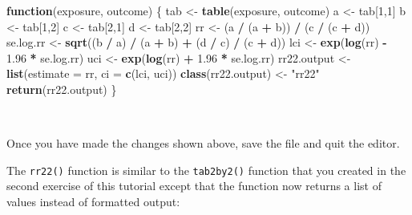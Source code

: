 \documentclass[12pt,a4paper]{book}
\newenvironment{Shaded}{\begin{snugshade}}{\end{snugshade}}
\newcommand{\ControlFlowTok}[1]{\textcolor[rgb]{0.13,0.29,0.53}{\textbf{#1}}}
\newcommand{\DataTypeTok}[1]{\textcolor[rgb]{0.13,0.29,0.53}{#1}}
\newcommand{\DecValTok}[1]{\textcolor[rgb]{0.00,0.00,0.81}{#1}}
\newcommand{\FloatTok}[1]{\textcolor[rgb]{0.00,0.00,0.81}{#1}}
\newcommand{\KeywordTok}[1]{\textcolor[rgb]{0.13,0.29,0.53}{\textbf{#1}}}
\newcommand{\NormalTok}[1]{#1}
\newcommand{\OperatorTok}[1]{\textcolor[rgb]{0.81,0.36,0.00}{\textbf{#1}}}
\newcommand{\StringTok}[1]{\textcolor[rgb]{0.31,0.60,0.02}{#1}}
\theoremstyle{definition}
\theoremstyle{definition}
\theoremstyle{definition}
\theoremstyle{remark}
\begin{document}
\begin{Shaded}
\begin{Highlighting}[]
\ControlFlowTok{function}\NormalTok{(exposure, outcome) \{}
\NormalTok{  tab <-}\StringTok{ }\KeywordTok{table}\NormalTok{(exposure, outcome)}
\NormalTok{  a <-}\StringTok{ }\NormalTok{tab[}\DecValTok{1}\NormalTok{,}\DecValTok{1}\NormalTok{]}
\NormalTok{  b <-}\StringTok{ }\NormalTok{tab[}\DecValTok{1}\NormalTok{,}\DecValTok{2}\NormalTok{]}
\NormalTok{  c <-}\StringTok{ }\NormalTok{tab[}\DecValTok{2}\NormalTok{,}\DecValTok{1}\NormalTok{]}
\NormalTok{  d <-}\StringTok{ }\NormalTok{tab[}\DecValTok{2}\NormalTok{,}\DecValTok{2}\NormalTok{]}
\NormalTok{  rr <-}\StringTok{ }\NormalTok{(a }\OperatorTok{/}\StringTok{ }\NormalTok{(a }\OperatorTok{+}\StringTok{ }\NormalTok{b)) }\OperatorTok{/}\StringTok{ }\NormalTok{(c }\OperatorTok{/}\StringTok{ }\NormalTok{(c }\OperatorTok{+}\StringTok{ }\NormalTok{d))}
\NormalTok{  se.log.rr <-}\StringTok{ }\KeywordTok{sqrt}\NormalTok{((b }\OperatorTok{/}\StringTok{ }\NormalTok{a) }\OperatorTok{/}\StringTok{ }\NormalTok{(a }\OperatorTok{+}\StringTok{ }\NormalTok{b) }\OperatorTok{+}\StringTok{ }\NormalTok{(d }\OperatorTok{/}\StringTok{ }\NormalTok{c) }\OperatorTok{/}\StringTok{ }\NormalTok{(c }\OperatorTok{+}\StringTok{ }\NormalTok{d))}
\NormalTok{  lci <-}\StringTok{ }\KeywordTok{exp}\NormalTok{(}\KeywordTok{log}\NormalTok{(rr) }\OperatorTok{-}\StringTok{ }\FloatTok{1.96} \OperatorTok{*}\StringTok{ }\NormalTok{se.log.rr)}
\NormalTok{  uci <-}\StringTok{ }\KeywordTok{exp}\NormalTok{(}\KeywordTok{log}\NormalTok{(rr) }\OperatorTok{+}\StringTok{ }\FloatTok{1.96} \OperatorTok{*}\StringTok{ }\NormalTok{se.log.rr)}
\NormalTok{  rr22.output <-}\StringTok{ }\KeywordTok{list}\NormalTok{(}\DataTypeTok{estimate =}\NormalTok{ rr, }\DataTypeTok{ci =} \KeywordTok{c}\NormalTok{(lci, uci))}
  \KeywordTok{class}\NormalTok{(rr22.output) <-}\StringTok{ "rr22"}
  \KeywordTok{return}\NormalTok{(rr22.output)}
\NormalTok{\}}
\end{Highlighting}
\end{Shaded}

~

Once you have made the changes shown above, save the file and quit the
editor.

The \texttt{rr22()} function is similar to the \texttt{tab2by2()}
function that you created in the second exercise of this tutorial except
that the function now returns a list of values instead of formatted
output:

~
\end{document}
